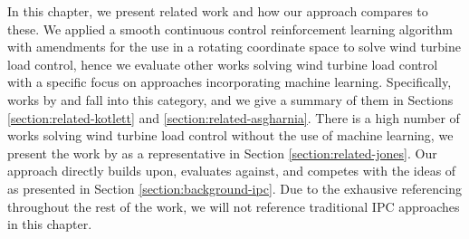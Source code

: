 \label{ch:related-work}

In this chapter, we present related work and how our approach compares to these. We applied a smooth continuous control reinforcement learning algorithm with amendments for the use in a rotating coordinate space to solve wind turbine load control, hence we evaluate other works solving wind turbine load control with a specific focus on approaches incorporating machine learning. Specifically, works by \citet{coqueletBiomimeticIndividualPitch2020} and \citet{asgharniaLoadMitigationClass2020} fall into this category, and we give a summary of them in Sections \ref{section:related-kotlett} and \ref{section:related-asgharnia}. There is a high number of works solving wind turbine load control without the use of machine learning, we present the work by \citet{jonesOvercomingFundamentalLimitations2018} as a representative in Section \ref{section:related-jones}. Our approach directly builds upon, evaluates against, and competes with the ideas of \citet{bossanyiIndividualBladePitch2003} as presented in Section \ref{section:background-ipc}. Due to the exhausive referencing throughout the rest of the work, we will not reference traditional \ac{IPC} approaches in this chapter. 



